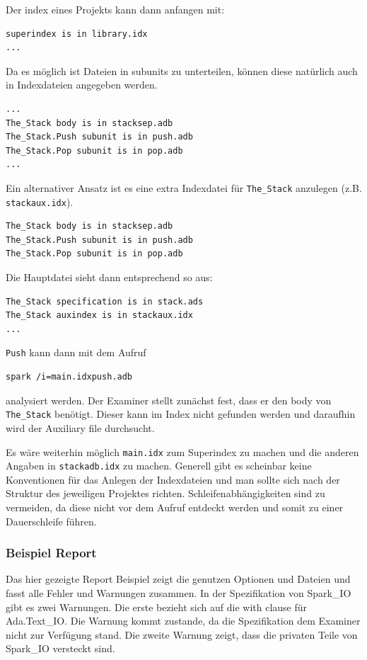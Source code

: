 Der index eines Projekts kann dann anfangen mit:

\begin{verbatim}
superindex is in library.idx
...
\end{verbatim}

Da es möglich ist Dateien in subunits zu unterteilen, können diese natürlich auch in Indexdateien angegeben werden.

\begin{verbatim}
...
The_Stack body is in stacksep.adb
The_Stack.Push subunit is in push.adb
The_Stack.Pop subunit is in pop.adb
...
\end{verbatim}

Ein alternativer Ansatz ist es eine extra Indexdatei für \texttt{The\_Stack} anzulegen (z.B. \texttt{stackaux.idx}).

\begin{verbatim}
The_Stack body is in stacksep.adb
The_Stack.Push subunit is in push.adb
The_Stack.Pop subunit is in pop.adb
\end{verbatim}

Die Hauptdatei sieht dann entsprechend so aus:

\begin{verbatim}
The_Stack specification is in stack.ads
The_Stack auxindex is in stackaux.idx
...
\end{verbatim}

\texttt{Push} kann dann mit dem Aufruf

\begin{verbatim}
spark /i=main.idxpush.adb
\end{verbatim}

analysiert werden.
Der Examiner stellt zunächst fest, dass er den body von \texttt{The\_Stack} benötigt. Dieser kann im Index nicht gefunden werden und daraufhin wird der Auxiliary file durchsucht.

Es wäre weiterhin möglich \texttt{main.idx} zum Superindex zu machen und die anderen Angaben in \texttt{stackadb.idx} zu machen. Generell gibt es scheinbar keine Konventionen für das Anlegen der Indexdateien und man sollte sich nach der Struktur des jeweiligen Projektes richten. Schleifenabhängigkeiten sind zu vermeiden, da diese nicht vor dem Aufruf entdeckt werden und somit zu einer Dauerschleife führen.

\subsubsection{Beispiel Report}
Das hier gezeigte Report Beispiel zeigt die genutzen Optionen und Dateien und fasst alle Fehler und Warnungen zusammen. In der Spezifikation von Spark\_IO gibt es zwei Warnungen. Die erste bezieht sich auf die with clause für Ada.Text\_IO. Die Warnung kommt zustande, da die Spezifikation dem Examiner nicht zur Verfügung stand.
Die zweite Warnung zeigt, dass die privaten Teile von Spark\_IO versteckt sind.

